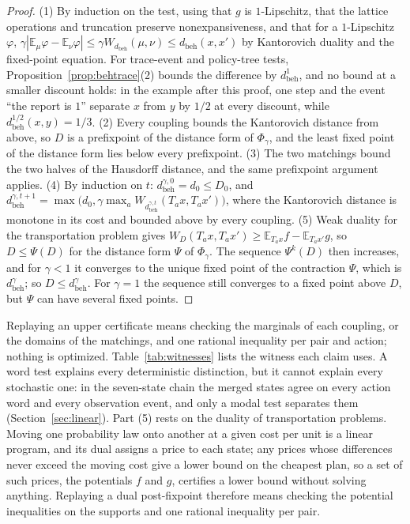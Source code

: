 \documentclass[11pt]{article}
\newcommand{\dbeh}{d_{\mathrm{beh}}}
\theoremstyle{definition}
\theoremstyle{plain}
\begin{document}
\begin{proof}
(1) By induction on the test, using that $g$ is $1$-Lipschitz, that the lattice operations and
truncation preserve nonexpansiveness, and that for a $1$-Lipschitz $\varphi$,
$\gamma|\mathbb E_\mu\varphi-\mathbb E_\nu\varphi|\le\gamma W_{\dbeh}(\mu,\nu)\le\dbeh(x,x')$ by
Kantorovich duality and the fixed-point equation. For trace-event and policy-tree tests,
Proposition~\ref{prop:behtrace}(2) bounds the difference by $\dbeh^{1}$, and no bound at a smaller
discount holds: in the example after this proof, one step and the event ``the report is $1$''
separate $x$ from $y$ by $1/2$ at every discount, while $\dbeh^{1/2}(x,y)=1/3$. (2) Every coupling
bounds the Kantorovich
distance from above, so $D$ is a prefixpoint of the distance form of $\Phi_\gamma$, and the least
fixed point of the distance form lies below every prefixpoint. (3) The two matchings bound the
two halves of the Hausdorff distance, and the same prefixpoint argument applies. (4) By induction
on $t$: $\dbeh^{\gamma,0}=d_0\le D_0$, and
$\dbeh^{\gamma,t+1}=\max\bigl(d_0,\gamma\max_aW_{\dbeh^{\gamma,t}}(T_ax,T_ax')\bigr)$, where the
Kantorovich distance is monotone in its cost and bounded above by every coupling. (5) Weak duality
for the transportation problem gives $W_D(T_ax,T_ax')\ge\mathbb E_{T_ax}f-\mathbb E_{T_ax'}g$, so
$D\le\Psi(D)$ for the distance form $\Psi$ of $\Phi_\gamma$. The sequence $\Psi^k(D)$ then increases,
and for $\gamma<1$ it converges to the unique fixed point of the contraction $\Psi$, which is
$\dbeh^\gamma$; so $D\le\dbeh^\gamma$. For $\gamma=1$ the sequence still converges to a fixed point
above $D$, but $\Psi$ can have several fixed points.
\end{proof}

Replaying an upper certificate means checking the marginals of each coupling, or the domains of
the matchings, and one rational inequality per pair and action; nothing is optimized.
Table~\ref{tab:witnesses} lists the witness each claim uses. A word test explains every
deterministic distinction, but it cannot explain every stochastic one: in the seven-state chain the
merged states agree on every action word and every observation event, and only a modal test
separates them (Section~\ref{sec:linear}). Part (5) rests on the duality of transportation
problems. Moving one probability law onto another at a given cost per unit is a linear program, and
its dual assigns a price to each state; any prices whose differences never exceed the moving cost
give a lower bound on the cheapest plan, so a set of such prices, the potentials $f$ and $g$,
certifies a lower bound without solving anything. Replaying a dual post-fixpoint therefore means
checking the potential inequalities on the supports and one rational inequality per pair.
\end{document}
